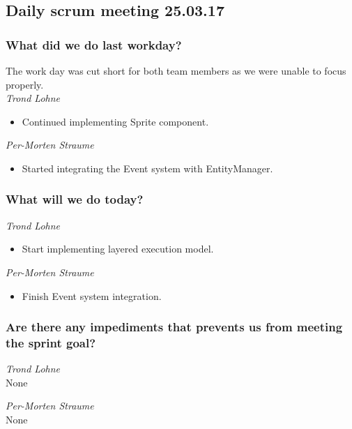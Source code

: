 \documentclass{article}
\begin{document}
\begin{center}
\subsection*{Daily scrum meeting 25.03.17}
\end{center}
\bigskip


\subsubsection*{What did we do last workday?}
The work day was cut short for both team members as we were unable to focus properly.\\

\noindent\textit{Trond Lohne}
\begin{itemize}
	\item 
	Continued implementing Sprite component.
\end{itemize}

\medskip

\noindent\textit{Per-Morten Straume}
\begin{itemize}
	\item 
	Started integrating the Event system with EntityManager.
\end{itemize}


\subsubsection*{What will we do today?}

\noindent\textit{Trond Lohne}
\begin{itemize}
	\item 
	Start implementing layered execution model.
\end{itemize}

\medskip

\noindent\textit{Per-Morten Straume}
\begin{itemize}
	\item 
	Finish Event system integration.
\end{itemize}


\subsubsection*{Are there any impediments that prevents us from meeting the sprint goal?}

\noindent\textit{Trond Lohne}\\
None

\medskip

\noindent\textit{Per-Morten Straume}\\
None
\end{document}
